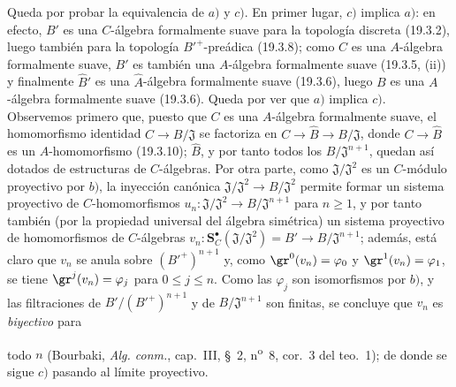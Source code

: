 \begin{env}[19.5.4.4]
\label{0.19.5.4.4-fr}
Queda por probar la equivalencia de $a)$ y $c)$. En primer lugar, $c)$ implica
$a)$: en efecto, $B'$ es una $C$-álgebra formalmente suave para la topología
discreta (19.3.2), luego también para la topología ${B'}^+$-preádica (19.3.8);
como $C$ es una $A$-álgebra formalmente suave, $B'$ es también una
$A$-álgebra formalmente suave (19.3.5, (ii)) y finalmente $\widehat{B}'$ es
una $\widehat A$-álgebra formalmente suave (19.3.6), luego $B$ es una
$A$-álgebra formalmente suave (19.3.6). Queda por ver que $a)$ implica $c)$.
Observemos primero que, puesto que $C$ es una $A$-álgebra formalmente suave,
el homomorfismo identidad $C\to B/\mathfrak J$ se factoriza en
$C\to\widehat B\to B/\mathfrak J$, donde $C\to\widehat B$ es un
$A$-homomorfismo (19.3.10); $\widehat B$, y por tanto todos los
$B/\mathfrak J^{n+1}$, quedan así dotados de estructuras de $C$-álgebras. Por otra
parte, como $\mathfrak J/\mathfrak J^2$ es un $C$-módulo proyectivo por $b)$,
la inyección canónica $\mathfrak J/\mathfrak J^2\to B/\mathfrak J^2$ permite
formar un sistema proyectivo de $C$-homomorfismos
$u_n:\mathfrak J/\mathfrak J^2\to B/\mathfrak J^{n+1}$ para $n\geq1$, y por
tanto también (por la propiedad universal del álgebra simétrica) un sistema
proyectivo de homomorfismos de $C$-álgebras
$v_n:\mathbf S_C^\bullet(\mathfrak J/\mathfrak J^2)=B'\to B/\mathfrak J^{n+1}$;
además, está claro que $v_n$ se anula sobre $({B'}^+)^{n+1}$ y, como
$\gr^0(v_n)=\varphi_0$ y $\gr^1(v_n)=\varphi_1$, se tiene
$\gr^j(v_n)=\varphi_j$ para $0\leq j\leq n$. Como las $\varphi_j$ son
isomorfismos por $b)$, y las filtraciones de
$B'/({B'}^+)^{n+1}$ y de $B/\mathfrak J^{n+1}$ son finitas, se concluye que
$v_n$ es \emph{biyectivo} para


todo $n$ (Bourbaki, \emph{Alg. conm.}, cap.~III, §~2,
n\textsuperscript{o}~8, cor.~3 del teo.~1); de donde se sigue $c)$ pasando al límite
proyectivo.
\end{env}


